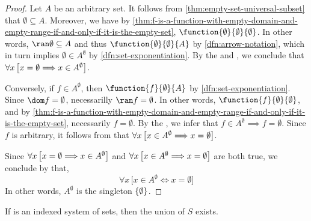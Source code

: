 \begin{proof}
    Let \( A \) be an arbitrary set. It follows from \cref{thm:empty-set-universal-subset} that \( \emptyset \subseteq A \).
    Moreover, we have by \cref{thm:f-is-a-function-with-empty-domain-and-empty-range-if-and-only-if-it-is-the-empty-set},
    \( \function{\emptyset}{\emptyset}{\emptyset} \). In other words, \( \ran \emptyset \subseteq A \) and thus
    \( \function{\emptyset}{\emptyset}{A} \) by \cref{dfn:arrow-notation}, which in turn implies \( \emptyset \in A^{\emptyset} \) by \cref{dfn:set-exponentiation}.
    By the  and ,
    we conclude that \( \forall x \, \mleft[ x = \emptyset {\implies} x \in A^{\emptyset} \mright] \).

    \vspace{0.3cm}
    \noindent
    Conversely, if \( f \in A^{\emptyset} \), then \( \function{f}{\emptyset}{A} \) by \cref{dfn:set-exponentiation}.
    Since \( \dom f = \emptyset \), necessarilly \( \ran f = \emptyset \). In other words, \( \function{f}{\emptyset}{\emptyset} \),
    and by \cref{thm:f-is-a-function-with-empty-domain-and-empty-range-if-and-only-if-it-is-the-empty-set}, necessarily \( f = \emptyset \).
    By the , we infer that \( f \in A^{\emptyset} {\implies} f = \emptyset \).
    Since \( f \) is arbitrary, it follows from  that
    \( \forall x \, \mleft[ x \in A^{\emptyset} {\implies} x = \emptyset \mright] \).

    \vspace{0.3cm}
    \noindent
    Since \( \forall x \, \mleft[ x = \emptyset {\implies} x \in A^{\emptyset} \mright]  \) and
    \( \forall x \, \mleft[ x \in A^{\emptyset} {\implies} x = \emptyset \mright] \) are both true, we conclude by
     that,
    \begin{equation*}
        \forall x \, \big[ x \in A^{\emptyset} \iff x = \emptyset \big]
    \end{equation*}
    In other words, \( A^{\emptyset} \) is the singleton \( \mleft\{ \emptyset \mright\} \).
\end{proof}

\begin{thm}
    \label{thm:existence-of-the-union-of-an-indexed-system-of-sets}
    If  is an indexed system of sets, then the union of \( S \) exists.
\end{thm}

